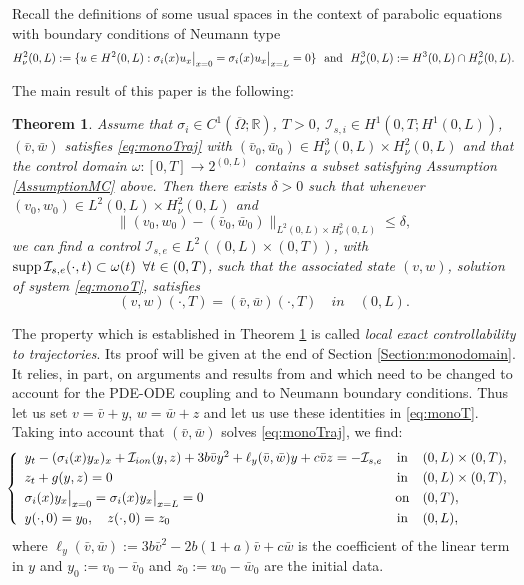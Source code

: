 \documentclass[10pt]{article}
\newtheorem{thm}{Theorem}
\def\dis{\displaystyle}
\def\om{\omega}
\def\Om{\Omega}
\def\\Phivec{\mathbf{\Phi}}
\begin{document}
	
	Recall the definitions of some usual spaces in the context of parabolic equations with boundary conditions of Neumann type $$
	H^2_\nu(0,L):=\{u\in H^2(0,L): {\sigma_i(x)}u_x\big|_{x=0}={\sigma_i(x)}u_x\big|_{x=L}=0\}~~\hbox{and}~~ H^3_\nu(0,L):=H^3(0,L)\cap H^2_\nu(0,L).
$$

	The main result of this paper is the following:
\begin{thm}\label{teo1}
    Assume that $\sigma_i\in C^1(\overline\Om;\mathbb{R})$, $T>0$, $\mathcal{I}_{s,i}\in H^1(0,T;H^1(0,L))$, $(\bar v,\bar w)$ satisfies \eqref{eq:monoTraj} with
    $(\bar v_0,\bar w_0)\in H^{3}_\nu(0,L)\times H^{2}_\nu(0,L)$
    and that the control domain $\om:[0,T]\rightarrow 2^{(0,L)}$ contains a subset %
    satisfying Assumption \ref{AssumptionMC} above.
    Then there exists $\delta>0$ such that whenever $(v_0,w_0)\in { L^2(0,L)}\times H^{2}_\nu(0,L)$ and
\[
    \|(v_0, w_0)-(\bar v_0,\bar w_0)\|_{L^{2}(0,L)\times H^{2}_\nu(0,L)}\leq\delta,
\]
    we can find a control $\mathcal{I}_{s,e}\in L^2((0,L)\times(0,T))$,
    with $\textnormal{supp}\,\mathcal{I}_{s,e}(\cdot,t)\subset\om(t)\,~\forall t\in(0,T)$, such that the associated state $(v,w)$, solution of system \eqref{eq:monoT}, satisfies
   \begin{equation}\label{exact_condition}
     (v,w)(\cdot,T) =(\bar v,\bar w)(\cdot, T) \quad\textit{in}\quad(0,L).
\end{equation}
\end{thm}

        The property which is established in Theorem \ref{teo1} is called {\it local exact controllability to trajectories}.
        Its proof will be given at the end of Section \ref{Section:monodomain}. It relies, in part,  on arguments and results from  \cite{CSZR} and \cite{CSSOUZA} which need to be changed to
    account for the PDE-ODE coupling and to  Neumann boundary conditions.  Thus let us set $v=\bar v +y$, $w=\bar{w}+z$
    and let us use these identities in \eqref{eq:monoT}. Taking into account that
    $(\bar{v},\bar{w})$ solves \eqref{eq:monoTraj}, we find:
\begin{equation}\label{eq:monoNull}
    \!\!\!\left\{
        \begin{array}{lcl}
        y_t-(\sigma_i(x) y_x)_x+\mathcal{I}_{ion}(y,z)+3b\bar v y^2+\ell_y(\bar v,\bar w)y+ c\bar v z
        =-\mathcal{I}_{s,e}           &\mbox{in}&(0,L) \times (0,T),    \\
        \noalign{\smallskip}\dis
        z_t   +g(y,z)= 0 &\mbox{in}&(0,L) \times (0,T),    \\
        \noalign{\smallskip}\dis
        \sigma_i(x)y_x\big|_{x=0}=\sigma_i(x)y_x\big|_{x=L} = 0 &\mbox{on}&(0,T),            \\
        \noalign{\smallskip}\dis
        y(\cdot,0) =y_0,\quad z(\cdot,0) =z_0 &\mbox{in}&(0,L),
        \end{array}
    \right.
\end{equation}
    where $\ell_y(\bar v,\bar w):=3b\bar v^2-2b(1+a)\bar v+c\bar w$
    is the coefficient of the linear term in $y$ and $y_0:=v_0-\bar v_0$ and
    $z_0:=w_0-\bar w_0$ are the initial data.
\end{document}
